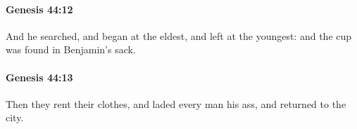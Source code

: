 		\paragraph{Genesis 44:12} %
			\label{GENESIS-44-12}

			And he searched, and began at the eldest, and left at the youngest: and the cup was found in Benjamin's sack.


		\paragraph{Genesis 44:13} %
			\label{GENESIS-44-13}

			Then they rent their clothes, and laded every man his ass, and returned to the city.



